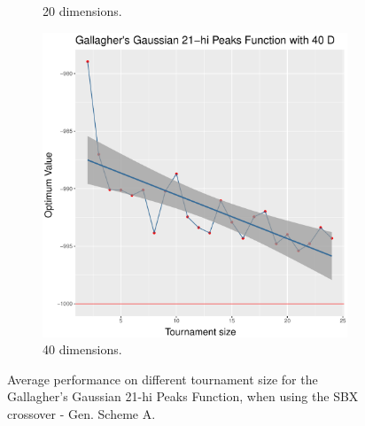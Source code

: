 \begin{figure}[t]
\begin{subfigure}[b]{0.33\textwidth}
		\caption{20 dimensions.}
	\end{subfigure}
	\begin{subfigure}[b]{0.33\textwidth}
		\centering
		\includegraphics[width=\textwidth]{img/multimodal_sbx_22_dim_40.pdf}
		\caption{40 dimensions.}
	\end{subfigure}
	\caption{Average performance on different tournament size for the Gallagher's Gaussian 21-hi Peaks Function, when using the SBX crossover - Gen. Scheme A.}
	\label{sbx-22}
\end{figure}


